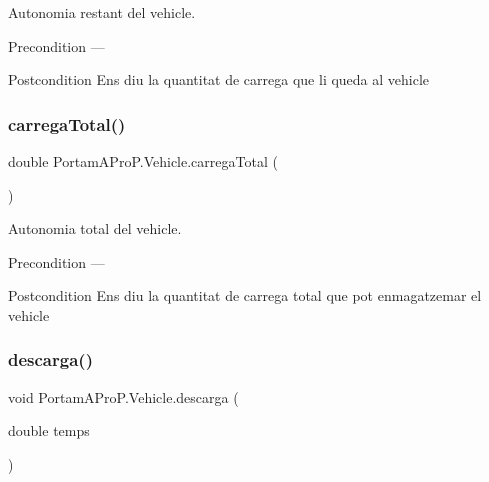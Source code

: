 Autonomia restant del vehicle. 

\begin{DoxyPrecond}{Precondition}
--- 
\end{DoxyPrecond}
\begin{DoxyPostcond}{Postcondition}
Ens diu la quantitat de carrega que li queda al vehicle 
\end{DoxyPostcond}
\mbox{\label{class_portam_a_pro_p_1_1_vehicle_aec1dd0d3144f2b4196e589fa1f9bc81b}} 
\subsubsection{\texorpdfstring{carrega\+Total()}{carregaTotal()}}
{\footnotesize\ttfamily double Portam\+A\+Pro\+P.\+Vehicle.\+carrega\+Total (\begin{DoxyParamCaption}{ }\end{DoxyParamCaption})}



Autonomia total del vehicle. 

\begin{DoxyPrecond}{Precondition}
--- 
\end{DoxyPrecond}
\begin{DoxyPostcond}{Postcondition}
Ens diu la quantitat de carrega total que pot enmagatzemar el vehicle 
\end{DoxyPostcond}
\mbox{\label{class_portam_a_pro_p_1_1_vehicle_a2b871f64c384f8fb8ebde6d1ff0282b0}} 
\subsubsection{\texorpdfstring{descarga()}{descarga()}}
{\footnotesize\ttfamily void Portam\+A\+Pro\+P.\+Vehicle.\+descarga (\begin{DoxyParamCaption}\item[{double}]{temps }\end{DoxyParamCaption})}



